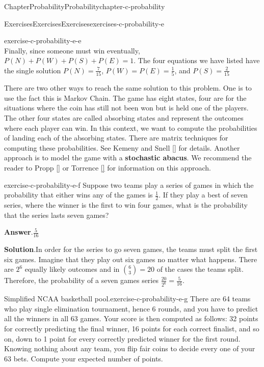 \documentclass[oneside,10pt,]{book}
\newcommand{\blocktitlefont}{\relax}
\newcommand{\xreffont}{\relax}
\newcommand{\terminology}[1]{\textbf{#1}}
\numberwithin{equation}{section}
\begin{document}
\begin{chapterptx}{Chapter}{Probability}{}{Probability}{}{}{chapter-c-probability}
\begin{exercises-section}{Exercises}{Exercises}{}{Exercises}{}{}{exercises-c-probability-e}
\begin{divisionexercise}{4}{}{}{exercise-c-probability-e-e}
\begin{equation*}
\end{equation*}
Finally, since someone must win eventually, \(P(N)+P(W)+P(S)+P(E)=1\).  The four equations we have listed have the single solution \(P(N)=\frac{7}{15}\), \(P(W)=P(E)=\frac{1}{5}\), and \(P(S)=\frac{2}{15}\)%
\par
There are two other ways to reach the same solution to this problem.  One is to use the fact this is Markov Chain.  The game has eight states, four are for the situations where the coin has still not been won but is held one of the players.  The other four states are called absorbing states and represent the outcomes where each player can win.  In this context, we want to compute the probabilities of landing each of the absorbing states.  There are matrix techniques for computing these probabilities.  See Kemeny and Snell \hyperlink{biblio-biblio-kemeny}{[{\xreffont 12}]} for details. Another approach is to model the game with a \terminology{stochastic abacus}.  We recommend the reader to Propp \hyperlink{biblio-biblio-propp}{[{\xreffont 14}]} or Torrence \hyperlink{biblio-biblio-torrence}{[{\xreffont 16}]}  for information on this approach.%
\end{divisionexercise}%
\begin{divisionexercise}{5}{}{}{exercise-c-probability-e-f}%
Suppose two teams play a series of games in which the probability that either wins any of the games is \(\frac{1}{2}\).  If they play a best of seven series, where the winner is the first to win four games, what is the probability that the series lasts seven games?%
\par\smallskip%
\noindent\textbf{\blocktitlefont Answer}.\hypertarget{answer-c-probability-e-f-b}{}\quad{}\(\frac{5}{16}\)%
\par\smallskip%
\noindent\textbf{\blocktitlefont Solution}.\hypertarget{solution-c-probability-e-f-c}{}\quad{}In order for the series to go seven games, the teams must split the first six games. Imagine that they play out six games no matter what happens.  There are \(2^6\) equally likely outcomes and in \(\binom{6}{3}=20\) of the cases the teams split. Therefore, the probability of a seven games series \(\frac{20}{2^6}= \frac{5}{16}\).%
\end{divisionexercise}%
\begin{divisionexercise}{6}{Simplified NCAA basketball pool.}{}{exercise-c-probability-e-g}%
There are 64 teams who play single elimination tournament, hence 6 rounds, and you have to predict all the winners in all 63 games. Your score is then computed as follows: 32 points for correctly predicting the final winner, 16 points for each correct finalist, and so on, down to 1 point for every correctly predicted winner for the first round. Knowing nothing about any team, you flip fair coins to decide every one of your 63 bets. Compute your expected number of points.%

\end{divisionexercise}
\end{exercises-section}
\end{chapterptx}
\end{document}
